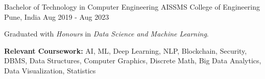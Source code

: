 

\begin{cventries}

  \cventry
    {Bachelor of Technology in Computer Engineering} %
    {AISSMS College of Engineering} %
    {Pune, India} %
    {Aug 2019 - Aug 2023} %
    {
      \begin{cvitems} %
        \item {Graduated with \textit{Honours} in \textit{Data Science and Machine Learning}.\hfill{}}
        \ifcv
            \item {\textbf{Relevant Coursework:} AI, ML, Deep Learning, NLP, Blockchain, Security, DBMS, Data Structures, Computer Graphics, Discrete Math, Big Data Analytics, Data Visualization, Statistics}
        \else\fi
      \end{cvitems}
    }

\end{cventries}
